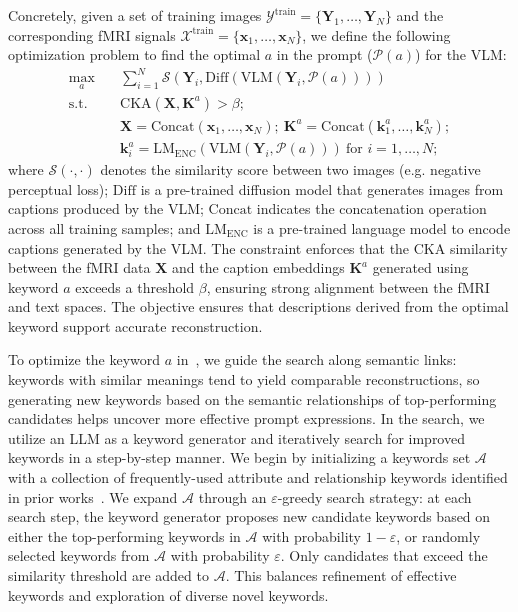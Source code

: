 
Concretely, given a set of training images $\mathcal{Y}^{\text{train}} = \{\mathbf{Y}_1, \ldots, \mathbf{Y}_N\}$ and the corresponding fMRI signals $\mathcal{X}^{\text{train}} = \{\mathbf{x}_1, \ldots, \mathbf{x}_N\}$, we define the following optimization problem to find the optimal $a$ in the prompt ($\mathcal{P}(a)$) for the VLM:
\vspace{-0.2cm}
\begin{align}
\max_{a} \quad & \sum_{i=1}^N\mathcal{S}\left(\mathbf{Y}_i,\text{Diff}(\text{VLM}(\mathbf{Y}_i,\mathcal{P}(a)))\right) \label{eq:opt_obj} \\
\text{s.t.} \quad & \text{CKA}\left(\mathbf{X}, \mathbf{K}^a\right) > \beta; \nonumber\\
& \mathbf{X}=\text{Concat}(\mathbf{x}_1,\ldots,\mathbf{x}_N);~\mathbf{K}^a=\text{Concat}(\mathbf{k}_1^a,\ldots,\mathbf{k}_N^a); \nonumber\\
& \mathbf{k}_i^a = \text{LM}_{\text{ENC}}(\text{VLM}(\mathbf{Y}_i,\mathcal{P}(a)))~\text{for } i=1,\ldots,N \nonumber;
\end{align}
where $\mathcal{S}(\cdot, \cdot)$ denotes the similarity score between two images (e.g. negative perceptual loss); $\text{Diff}$ is a pre-trained diffusion model that generates images from captions produced by the VLM; $\text{Concat}$ indicates the concatenation operation across all training samples; and $\text{LM}_{\text{ENC}}$ is a pre-trained language model to encode captions generated by the VLM. The constraint enforces that the CKA similarity between the fMRI data $\mathbf{X}$ and the caption embeddings $\mathbf{K}^a$ generated using keyword $a$ exceeds a threshold $\beta$, ensuring strong alignment between the fMRI and text spaces. The objective ensures that descriptions derived from the optimal keyword support accurate reconstruction.

To optimize the keyword $a$ in~, we guide the search along semantic links: keywords with similar meanings tend to yield comparable reconstructions, so generating new keywords based on the semantic relationships of top-performing candidates helps uncover more effective prompt expressions. In the search, we utilize an LLM as a keyword generator and iteratively search for improved keywords in a step-by-step manner. We begin by initializing a keywords set $\mathcal{A}$ with a collection of frequently-used attribute and relationship keywords identified in prior works~\citep{johnson2015image,lu2016visual,krishna2017visual}. We expand $\mathcal{A}$ through an $\varepsilon$-greedy search strategy: at each search step, the keyword generator proposes new candidate keywords based on either the top-performing keywords in $\mathcal{A}$ with probability $1{-}\varepsilon$, or randomly selected keywords from $\mathcal{A}$ with probability $\varepsilon$. Only candidates that exceed the similarity threshold are added to $\mathcal{A}$. This balances refinement of effective keywords and exploration of diverse novel keywords.




